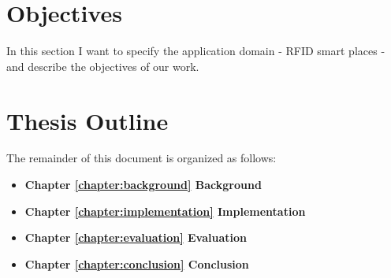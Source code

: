 \section{Objectives}
\label{section:objectives}
In this section I want to specify the application domain - RFID smart places - and describe the
objectives of our work.
\section{Thesis Outline}
\label{section:outline}
The remainder of this document is organized as follows:
\begin{itemize}
  \item \textbf{Chapter \ref{chapter:background} Background}
  \item \textbf{Chapter \ref{chapter:implementation} Implementation}
  \item \textbf{Chapter \ref{chapter:evaluation} Evaluation}
  \item \textbf{Chapter \ref{chapter:conclusion} Conclusion}
\end{itemize}
